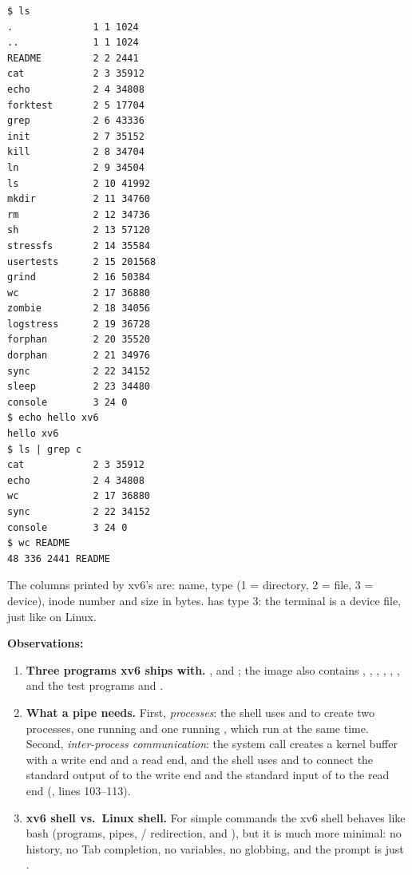 \documentclass[11pt,a4paper]{article}
\begin{document}
\begin{lstlisting}
$ ls
.              1 1 1024
..             1 1 1024
README         2 2 2441
cat            2 3 35912
echo           2 4 34808
forktest       2 5 17704
grep           2 6 43336
init           2 7 35152
kill           2 8 34704
ln             2 9 34504
ls             2 10 41992
mkdir          2 11 34760
rm             2 12 34736
sh             2 13 57120
stressfs       2 14 35584
usertests      2 15 201568
grind          2 16 50384
wc             2 17 36880
zombie         2 18 34056
logstress      2 19 36728
forphan        2 20 35520
dorphan        2 21 34976
sync           2 22 34152
sleep          2 23 34480
console        3 24 0
$ echo hello xv6
hello xv6
$ ls | grep c
cat            2 3 35912
echo           2 4 34808
wc             2 17 36880
sync           2 22 34152
console        3 24 0
$ wc README
48 336 2441 README
\end{lstlisting}

The columns printed by xv6's  are: name, type (1 = directory, 2 = file, 3 = device),
inode number and size in bytes.  has type 3: the terminal is a device file, just
like  on Linux.

\textbf{Observations:}
\begin{enumerate}
  \item \textbf{Three programs xv6 ships with.} ,  and ; the
  image also contains , , , , ,
  ,  and the test programs  and .
  \item \textbf{What a pipe needs.} First, \emph{processes}: the shell uses  and
   to create two processes, one running  and one running , which
  run at the same time. Second, \emph{inter-process communication}: the  system call
  creates a kernel buffer with a write end and a read end, and the shell uses  and
   to connect the standard output of  to the write end and the standard
  input of  to the read end (, lines 103--113).
  \item \textbf{xv6 shell vs.\ Linux shell.} For simple commands the xv6 shell behaves like
  bash (programs, pipes, \code{>}/\code{<} redirection, \code{;} and \code{\&}), but it is much
  more minimal: no history, no Tab completion, no variables, no \code{*} globbing, and the
  prompt is just \code{\$}.
\end{enumerate}
\end{document}
